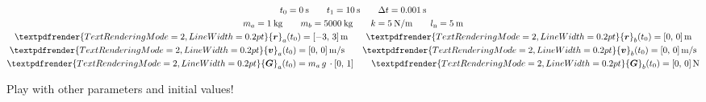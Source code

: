\documentclass[a4paper,12pt,%
onecolumn,oneside,%
british%
]{memoir}
\renewcommand*{\bm}[1]{\textpdfrender{TextRenderingMode=2,LineWidth=0.2pt}{\boldsymbol{#1}}}
\newcommand*{\incr}{\Delta}%
\renewcommand*{\|}[1][]{\nonscript\:#1\vert\nonscript\:\mathopen{}}
\newcommand*{\yr}{\bm{r}}
\newcommand*{\yra}{\yr_{a}}
\newcommand*{\yrb}{\yr_{b}}
\newcommand*{\yv}{\bm{v}}
\newcommand*{\yva}{\yv_{a}}
\newcommand*{\yvb}{\yv_{b}}
\newcommand*{\ylo}{l_{\textrm{n}}}
\newcommand*{\yti}{t_{0}}
\newcommand*{\ytf}{t_{1}}
\newcommand*{\Dt}{\incr t}
\newcommand*{\ym}{m}%
\newcommand*{\yma}{\ym_{a}}
\newcommand*{\ymb}{\ym_{b}}
\newcommand*{\yG}{\bm{G}}
\newcommand*{\yGa}{\yG_{a}}
\newcommand*{\yGb}{\yG_{b}}
\begin{document}
\begin{exercise}[label={ex:nonhooke}]
\begin{description}[itemsep=\baselineskip]
  \item[Set 4:]
        \begin{equation*}
      \begin{gathered}
        \yti=\qty{0}{s}
        \qquad
        \ytf=\qty{10}{s}
        \qquad
        \Dt = \qty{0.001}{s}
        \\
        \yma=\qty{1}{kg}
        \qquad
        \ymb=\qty{5000}{kg}
        \qquad
        k=\qty{5}{N/m}
        \qquad
        \ylo = \qty{5}{m}
        \\
        \yra(\yti)=[\num{-3},\, \num{3}]\,\unit{m}
        \qquad
        \yrb(\yti)=[\num{0},\, \num{0}]\,\unit{m}
        \\
        \yva(\yti)=[\num{0},\, \num{0}]\,\unit{m/s}
        \qquad
        \yvb(\yti)=[\num{0},\, \num{0}]\,\unit{m/s}
        \\
        \yGa(\yti)= \yma\,g\,\cdot[0,\, 1]
        \qquad
        \yGb(\yti)=[\num{0},\, \num{0}]\,\unit{N}
      \end{gathered}
    \end{equation*}
  \end{description}

  Play with other parameters and initial values!
\end{exercise}
\end{document}
